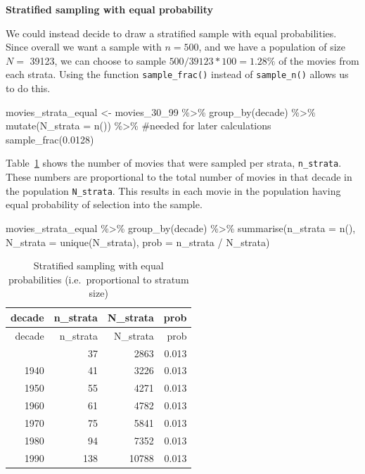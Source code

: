 \documentclass[
  letterpaper,
  DIV=11,
  numbers=noendperiod]{scrreprt}
\newenvironment{Shaded}{\begin{snugshade}}{\end{snugshade}}
\newcommand{\AttributeTok}[1]{\textcolor[rgb]{0.40,0.45,0.13}{#1}}
\newcommand{\CommentTok}[1]{\textcolor[rgb]{0.37,0.37,0.37}{#1}}
\newcommand{\FloatTok}[1]{\textcolor[rgb]{0.68,0.00,0.00}{#1}}
\newcommand{\FunctionTok}[1]{\textcolor[rgb]{0.28,0.35,0.67}{#1}}
\newcommand{\NormalTok}[1]{\textcolor[rgb]{0.00,0.23,0.31}{#1}}
\newcommand{\OtherTok}[1]{\textcolor[rgb]{0.00,0.23,0.31}{#1}}
\newcommand{\SpecialCharTok}[1]{\textcolor[rgb]{0.37,0.37,0.37}{#1}}
\theoremstyle{definition}
\theoremstyle{remark}
\begin{document}
\textbf{Stratified sampling with equal probability}

We could instead decide to draw a stratified sample with equal
probabilities. Since overall we want a sample with \(n = 500\), and we
have a population of size \(N =\) 39123, we can choose to sample
\(500 / 39123 *100 = 1.28\%\) of the movies from each strata. Using the
function \texttt{sample\_frac()} instead of \texttt{sample\_n()} allows
us to do this.

\begin{Shaded}
\begin{Highlighting}[]
\NormalTok{movies\_strata\_equal }\OtherTok{\textless{}{-}}\NormalTok{ movies\_30\_99 }\SpecialCharTok{\%\textgreater{}\%} 
  \FunctionTok{group\_by}\NormalTok{(decade) }\SpecialCharTok{\%\textgreater{}\%} 
  \FunctionTok{mutate}\NormalTok{(}\AttributeTok{N\_strata =} \FunctionTok{n}\NormalTok{()) }\SpecialCharTok{\%\textgreater{}\%} \CommentTok{\#needed for later calculations}
  \FunctionTok{sample\_frac}\NormalTok{(}\FloatTok{0.0128}\NormalTok{)}
\end{Highlighting}
\end{Shaded}

Table~\ref{tbl-strata-probs-equal} shows the number of movies that were
sampled per strata, \texttt{n\_strata}. These numbers are proportional
to the total number of movies in that decade in the population
\texttt{N\_strata}. This results in each movie in the population having
equal probability of selection into the sample.

\begin{Shaded}
\begin{Highlighting}[]
\NormalTok{movies\_strata\_equal }\SpecialCharTok{\%\textgreater{}\%} 
  \FunctionTok{group\_by}\NormalTok{(decade) }\SpecialCharTok{\%\textgreater{}\%} 
  \FunctionTok{summarise}\NormalTok{(}\AttributeTok{n\_strata =} \FunctionTok{n}\NormalTok{(), }\AttributeTok{N\_strata =} \FunctionTok{unique}\NormalTok{(N\_strata), }
            \AttributeTok{prob =}\NormalTok{ n\_strata }\SpecialCharTok{/}\NormalTok{ N\_strata)}
\end{Highlighting}
\end{Shaded}

\hypertarget{tbl-strata-probs-equal}{}
\begin{longtable}[]{@{}rrrr@{}}
\caption{\label{tbl-strata-probs-equal}Stratified sampling with equal
probabilities (i.e.~proportional to stratum size)}\tabularnewline
\toprule\noalign{}
decade & n\_strata & N\_strata & prob \\
\midrule\noalign{}
\endfirsthead
\toprule\noalign{}
decade & n\_strata & N\_strata & prob \\
\midrule\noalign{}
\endhead
\bottomrule\noalign{}
\endlastfoot
1930 & 37 & 2863 & 0.013 \\
1940 & 41 & 3226 & 0.013 \\
1950 & 55 & 4271 & 0.013 \\
1960 & 61 & 4782 & 0.013 \\
1970 & 75 & 5841 & 0.013 \\
1980 & 94 & 7352 & 0.013 \\
1990 & 138 & 10788 & 0.013 \\
\end{longtable}
\end{document}
